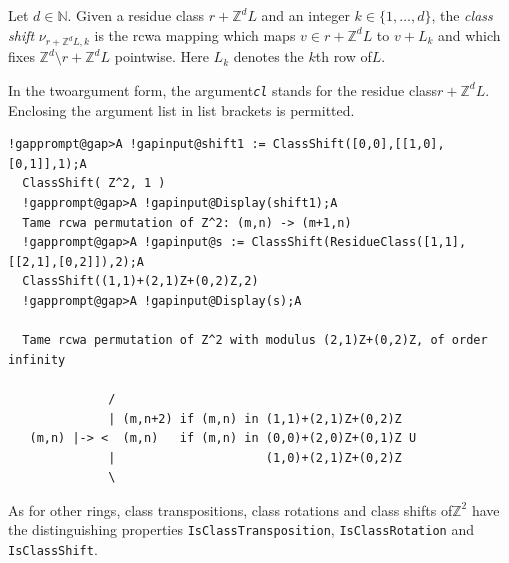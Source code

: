 \documentclass[a4paper,11pt]{report}
\begin{document}
{{{ Let $d \in {\ensuremath{\mathbb N}}$. Given a residue class $r+{\ensuremath{\mathbb Z}}^dL$ and an integer $k \in \{1, \dots, d\}$, the \emph{class shift} $\nu_{r+{\ensuremath{\mathbb Z}}^dL,k}$ is the rcwa mapping which maps $v \in r+{\ensuremath{\mathbb Z}}^dL$ to $v + L_k$ and which fixes ${\ensuremath{\mathbb Z}}^d \setminus r+{\ensuremath{\mathbb Z}}^dL$ pointwise. Here $L_k$ denotes the $k$th row of{\nobreakspace}$L$. 

 In the two\texttt{}argument form, the argument{\nobreakspace}\mbox{\texttt{\mdseries\slshape cl}} stands for the residue class{\nobreakspace}$r+{\ensuremath{\mathbb Z}}^dL$. Enclosing the argument list in list brackets is permitted. 
\begin{Verbatim}[commandchars=!@A,fontsize=\small,frame=single,label=Example]
  !gapprompt@gap>A !gapinput@shift1 := ClassShift([0,0],[[1,0],[0,1]],1);A
  ClassShift( Z^2, 1 )
  !gapprompt@gap>A !gapinput@Display(shift1);A
  Tame rcwa permutation of Z^2: (m,n) -> (m+1,n)
  !gapprompt@gap>A !gapinput@s := ClassShift(ResidueClass([1,1],[[2,1],[0,2]]),2);A
  ClassShift((1,1)+(2,1)Z+(0,2)Z,2)
  !gapprompt@gap>A !gapinput@Display(s);A
  
  Tame rcwa permutation of Z^2 with modulus (2,1)Z+(0,2)Z, of order infinity
  
              /
              | (m,n+2) if (m,n) in (1,1)+(2,1)Z+(0,2)Z
   (m,n) |-> <  (m,n)   if (m,n) in (0,0)+(2,0)Z+(0,1)Z U 
              |                     (1,0)+(2,1)Z+(0,2)Z
              \
\end{Verbatim}
 }

    As for other rings, class transpositions, class rotations and class shifts
of{\nobreakspace}${\ensuremath{\mathbb Z}}^2$ have the distinguishing properties \texttt{IsClassTransposition}, \texttt{IsClassRotation} and \texttt{IsClassShift}. }

  
}
\end{document}
